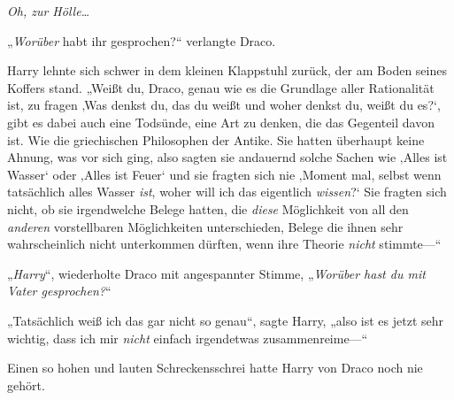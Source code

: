 \emph{Oh, zur Hölle…}

„\emph{Worüber} habt ihr gesprochen?“ verlangte Draco.

Harry lehnte sich schwer in dem kleinen Klappstuhl zurück, der am Boden seines Koffers stand. „Weißt du, Draco, genau wie es die Grundlage aller Rationalität ist, zu fragen ‚Was denkst du, das du weißt und woher denkst du, weißt du es?‘, gibt es dabei auch eine Todsünde, eine Art zu denken, die das Gegenteil davon ist. Wie die griechischen Philosophen der Antike. Sie hatten überhaupt keine Ahnung, was vor sich ging, also sagten sie andauernd solche Sachen wie ‚Alles ist Wasser‘ oder ‚Alles ist Feuer‘ und sie fragten sich nie ‚Moment mal, selbst wenn tatsächlich alles Wasser \emph{ist}, woher will ich das eigentlich \emph{wissen}?‘ Sie fragten sich nicht, ob sie irgendwelche Belege hatten, die \emph{diese} Möglichkeit von all den \emph{anderen} vorstellbaren Möglichkeiten unterschieden, Belege die ihnen sehr wahrscheinlich nicht unterkommen dürften, wenn ihre Theorie \emph{nicht} stimmte—“

„\emph{Harry}“, wiederholte Draco mit angespannter Stimme, „\emph{Worüber hast du mit Vater gesprochen?}“

„Tatsächlich weiß ich das gar nicht so genau“, sagte Harry, „also ist es jetzt sehr wichtig, dass ich mir \emph{nicht} einfach irgendetwas zusammenreime—“

Einen so hohen und lauten Schreckensschrei hatte Harry von Draco noch nie gehört.

